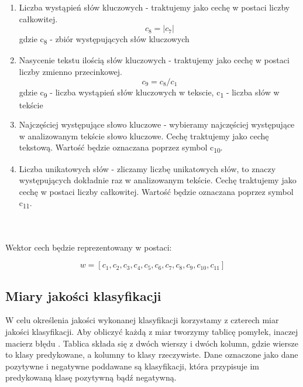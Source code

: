 \documentclass{classrep}
\begin{document}
\begin{enumerate}
  \item Liczba wystąpień słów kluczowych - traktujemy jako cechę w postaci liczby całkowitej.\begin{equation}  c_8 = | c_7 | \end{equation} gdzie c\textsubscript{8} - zbiór występujących słów kluczowych\\
  \item Nasycenie tekstu ilością słów kluczowych - traktujemy jako cechę w postaci liczby zmienno przecinkowej.  \begin{equation} c_{9} = c_8 / c_1 \end{equation}  gdzie c\textsubscript{9} - liczba wystąpień słów kluczowych w tekscie, c\textsubscript{1} - liczba słów w tekście\\
  \item Najczęściej występujące słowo kluczowe - wybieramy najczęściej występujące w analizowanym tekście słowo kluczowe. Cechę traktujemy jako cechę tekstową. Wartość będzie oznaczana poprzez symbol  c\textsubscript{10}.\\
  \item Liczba unikatowych słów - zliczamy liczbę unikatowych słów, to znaczy występujących dokładnie raz w analizowanym tekście. Cechę traktujemy jako cechę w postaci liczby całkowitej. Wartość będzie oznaczana poprzez symbol  c\textsubscript{11}.\\
\end{enumerate}


\ \\ \\
Wektor cech będzie reprezentowany w postaci: 

\begin{equation} w = [c_1, c_2, c_3, c_4, c_5, c_6, c_7, c_8, c_9, c_{10}, c_{11}] \end{equation}


\subsection{Miary jakości klasyfikacji} 

W celu określenia jakości wykonanej klasyfikacji korzystamy z czterech miar jakości klasyfikacji. Aby obliczyć każdą z miar tworzymy tablicę pomyłek, inaczej macierz błędu \cite{tablica}. Tablica składa się z dwóch wierszy i dwóch kolumn, gdzie wiersze to klasy predykowane, a kolumny to klasy rzeczywiste. Dane oznaczone jako dane pozytywne i negatywne poddawane są klasyfikacji, która przypisuje im predykowaną klasę pozytywną bądź negatywną.\\
\end{document}
